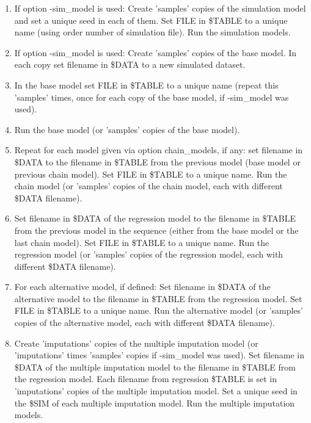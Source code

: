 \begin{enumerate}

\item If option -sim\_model is used: Create 'samples' copies of the simulation model and set a unique  seed in each of them. Set FILE in \$TABLE to a unique name (using order number of simulation file). Run the simulation models.
\item If option -sim\_model is used: Create 'samples' copies of the base model. In each copy set filename in \$DATA to a new simulated dataset.
\item In the base model set FILE in \$TABLE to a unique name (repeat this 'samples' times, once for each copy of the base model, if -sim\_model was used).
\item Run the base model (or 'samples' copies of the base model).
\item Repeat for each model given via option chain\_models, if any: set filename in \$DATA to the filename in \$TABLE from the previous model (base model or previous chain model). Set FILE in \$TABLE to a unique name. Run the chain model (or 'samples' copies of the chain model, each with different \$DATA filename).
\item Set filename in \$DATA of the regression model to the filename in \$TABLE from the previous model in the sequence (either from the base model or the last chain model). Set FILE in \$TABLE to a unique name. Run the regression model (or 'samples' copies of the regression model, each with different \$DATA filename).
\item For each alternative model, if defined: Set filename in \$DATA of the alternative model to the filename in \$TABLE from the regression model. Set FILE in \$TABLE to a unique name. Run the alternative model (or 'samples' copies of the alternative model, each with different \$DATA filename).
\item Create 'imputations' copies of the multiple imputation model (or 'imputations' times 'samples' copies if -sim\_model was used). Set filename in \$DATA of the multiple imputation model to the filename in \$TABLE from the regression model. Each filename from regression \$TABLE is set in 'imputations' copies of the multiple imputation model. Set a unique seed in the \$SIM of each multiple imputation model. Run the multiple imputation models.
\end{enumerate}

{}




